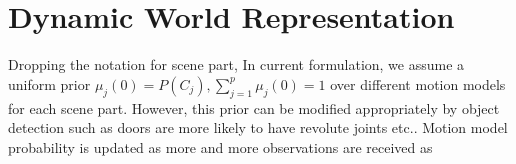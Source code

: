 \documentclass[10pt,twocolumn,letterpaper]{article}
\begin{document}
\section{Dynamic World Representation} 
% 
% 
% 
Dropping the notation for scene part, In current formulation, we assume a uniform prior $\mu_j(0) = P(C_j), \sum_{j=1}^{p}\mu_j(0) = 1$ over different motion models for each scene part. However, this prior can be modified appropriately by object detection such as doors are more likely to have revolute joints etc.. Motion model probability is updated as more and more observations are received \cite{yaakov2001estimation} as 
\end{document}
